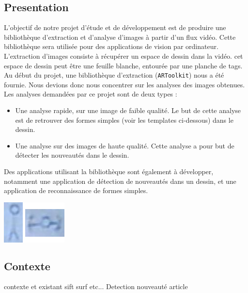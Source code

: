 \subsection{Presentation}

L'objectif de notre projet d'étude et de développement est de produire une bibliothèque d'extraction et d'analyse d'images à partir d'un flux vidéo. Cette bibliothèque sera utilisée pour des applications de vision par ordinateur.\\

L'extraction d'images consiste à récupérer un espace de dessin dans la vidéo. cet espace de dessin peut être une feuille blanche, entourée par une planche de tags. Au début du projet, une bibliothèque d'extraction (\texttt{ARToolkit}) nous a été fournie. Nous devions donc nous concentrer sur les analyses des images obtenues.\\

Les analyses demandées par ce projet sont de deux types : 
\begin{itemize}
\item Une analyse rapide, sur une image de faible qualité. Le but de cette analyse est de retrouver des formes simples (voir les templates ci-dessous) dans le dessin.
\item Une analyse sur des images de haute qualité. Cette analyse a pour but de détecter les nouveautés dans le dessin.\\
\end{itemize}
Des applications utilisant la bibliothèque sont également à développer, notamment une application de détection de nouveautés dans un dessin, et une application de reconnaissance de formes simples.

\begin{center}
\includegraphics[scale=1]{images/templates.png}
\end{center}


\subsection{Contexte}
contexte et existant sift surf etc...
Detection nouveauté article
